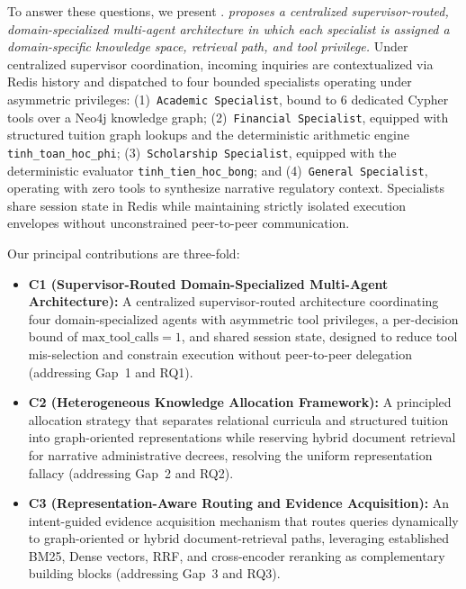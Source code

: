 To answer these questions, we present \textbf{\system{}}. \emph{\system{} proposes a centralized supervisor-routed, domain-specialized multi-agent architecture in which each specialist is assigned a domain-specific knowledge space, retrieval path, and tool privilege.} Under centralized supervisor coordination, incoming inquiries are contextualized via Redis history and dispatched to four bounded specialists operating under asymmetric privileges: (1)~\texttt{Academic Specialist}, bound to 6 dedicated Cypher tools over a Neo4j knowledge graph; (2)~\texttt{Financial Specialist}, equipped with structured tuition graph lookups and the deterministic arithmetic engine \texttt{tinh\_toan\_hoc\_phi}; (3)~\texttt{Scholarship Specialist}, equipped with the deterministic evaluator \texttt{tinh\_tien\_hoc\_bong}; and (4)~\texttt{General Specialist}, operating with zero tools to synthesize narrative regulatory context. Specialists share session state in Redis while maintaining strictly isolated execution envelopes without unconstrained peer-to-peer communication.

Our principal contributions are three-fold:
\begin{itemize}
    \setlength{\itemsep}{1.5pt}
    \setlength{\parsep}{0pt}
    \setlength{\parskip}{0pt}
    \item \textbf{C1 (Supervisor-Routed Domain-Specialized Multi-Agent Architecture):} A centralized supervisor-routed architecture coordinating four domain-specialized agents with asymmetric tool privileges, a per-decision bound of $\text{max\_tool\_calls}=1$, and shared session state, designed to reduce tool mis-selection and constrain execution without peer-to-peer delegation (addressing Gap~1 and RQ1).
    \item \textbf{C2 (Heterogeneous Knowledge Allocation Framework):} A principled allocation strategy that separates relational curricula and structured tuition into graph-oriented representations while reserving hybrid document retrieval for narrative administrative decrees, resolving the uniform representation fallacy (addressing Gap~2 and RQ2).
    \item \textbf{C3 (Representation-Aware Routing and Evidence Acquisition):} An intent-guided evidence acquisition mechanism that routes queries dynamically to graph-oriented or hybrid document-retrieval paths, leveraging established BM25, Dense vectors, RRF, and cross-encoder reranking as complementary building blocks (addressing Gap~3 and RQ3).
\end{itemize}
